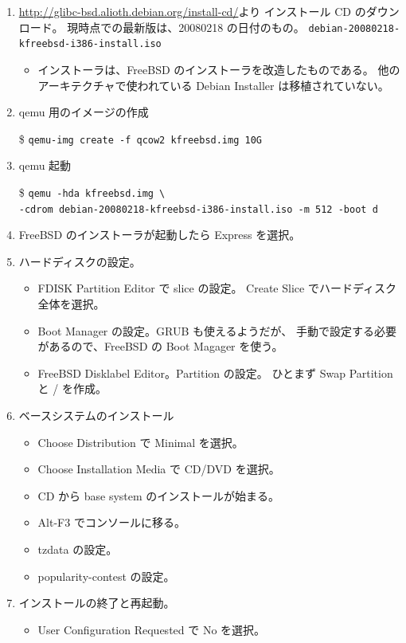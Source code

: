 \documentclass[mingoth,a4paper]{jsarticle}
\begin{document}
\begin{enumerate}
\item \url{http://glibc-bsd.alioth.debian.org/install-cd/}より
  インストール CD のダウンロード。
  現時点での最新版は、20080218 の日付のもの。
  \texttt{debian-20080218-kfreebsd-i386-install.iso}
  \begin{itemize}
  \item インストーラは、FreeBSD のインストーラを改造したものである。
    他のアーキテクチャで使われている Debian Installer は移植されていない。
  \end{itemize}
\item qemu 用のイメージの作成

  \$ \verb|qemu-img create -f qcow2 kfreebsd.img 10G|
\item qemu 起動

  \$ \verb|qemu -hda kfreebsd.img \| \\
  \verb|-cdrom debian-20080218-kfreebsd-i386-install.iso -m 512 -boot d|
\item FreeBSD のインストーラが起動したら Express を選択。
\item ハードディスクの設定。
  \begin{itemize}
  \item FDISK Partition Editor で slice の設定。
    Create Slice でハードディスク全体を選択。
  \item Boot Manager の設定。GRUB も使えるようだが、
    手動で設定する必要があるので、FreeBSD の Boot Magager を使う。
  \item FreeBSD Disklabel Editor。Partition の設定。
    ひとまず Swap Partition と / を作成。
  \end{itemize}
\item ベースシステムのインストール
  \begin{itemize}
  \item Choose Distribution で Minimal を選択。
  \item Choose Installation Media で CD/DVD を選択。
  \item CD から base system のインストールが始まる。
  \item Alt-F3 でコンソールに移る。
  \item tzdata の設定。
  \item popularity-contest の設定。
  \end{itemize}
\item インストールの終了と再起動。
  \begin{itemize}
  \item User Configuration Requested で No を選択。

\end{itemize}
\end{enumerate}
\end{document}
